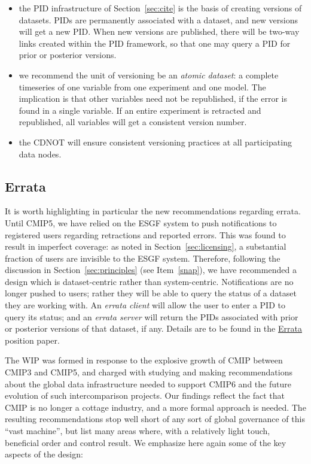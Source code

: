 \documentclass[gmd,manuscript]{copernicus}
\newcommand{\secref}[1] {\mbox{Section  \ref{sec:#1}}}
\begin{document}
\begin{itemize}
\item the PID infrastructure of \secref{cite} is the basis of creating
  versions of datasets. PIDs are permanently associated with a
  dataset, and new versions will get a new PID. When new versions are
  published, there will be two-way links created within the PID
  framework, so that one may query a PID for prior or posterior versions.
\item we recommend the unit of versioning be an \emph{atomic dataset}:
  a complete timeseries of one variable from one experiment and one
  model. The implication is that other variables need not be
  republished, if the error is found in a single variable. If an
  entire experiment is retracted and republished, all variables will
  get a consistent version number.
\item the CDNOT will ensure consistent versioning practices at all
  participating data nodes.
\end{itemize}

\subsection{Errata}
\label{sec:errata}

It is worth highlighting in particular the new recommendations
regarding errata. Until CMIP5, we have relied on the ESGF system to
push notifications to registered users regarding retractions and
reported errors. This was found to result in imperfect coverage: as
noted in \secref{licensing}, a substantial fraction of users are
invisible to the ESGF system. Therefore, following the discussion in
\secref{principles} (see Item~\ref{snap}), we have recommended a
design which is dataset-centric rather than system-centric.
Notifications are no longer pushed to users; rather they will be able to
query the status of a dataset they are working with. An
\emph{errata client} will allow the user to enter a PID to query its
status; and an \emph{errata server} will return the PIDs associated
with prior or posterior versions of that dataset, if any. Details are
to be found in the \href{https://goo.gl/qjs8WK}{Errata} position
paper.

\label{sec:summary}

The WIP was formed in response to the explosive growth of CMIP between
CMIP3 and CMIP5, and charged with studying and making recommendations
about the global data infrastructure needed to support CMIP6 and the
future evolution of such intercomparison projects. Our findings reflect 
the fact that CMIP is no longer a cottage industry, and a more formal 
approach is needed. The resulting recommendations stop well short of 
any sort of global governance of this ``vast machine'', but list many 
areas where, with a relatively light touch, beneficial order and 
control result. We emphasize here again some of the key aspects of 
the design:
\end{document}
